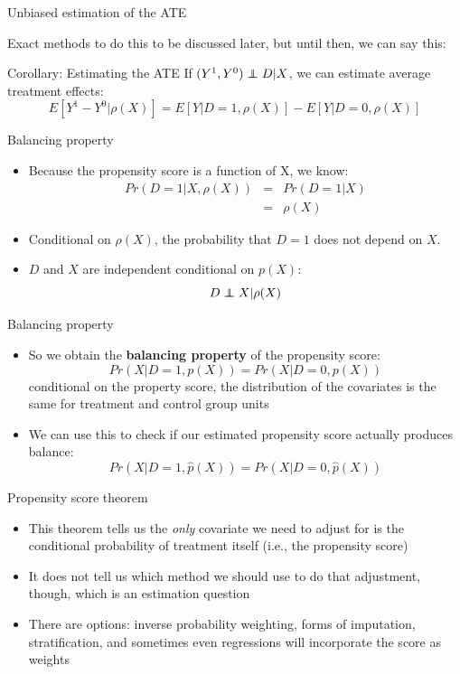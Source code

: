 \documentclass{beamer}
\newcommand\independent{\protect\mathpalette{\protect\independenT}{\perp}}
\def\independenT#1#2{\mathrel{\rlap{$#1#2$}\mkern2mu{#1#2}}}
\begin{document}
\begin{frame}{Unbiased estimation of the ATE}

Exact methods to do this to be discussed later, but until then, we can say this:
	\begin{block}{Corollary: Estimating the ATE}
	If $(Y^1,Y^0)\independent{D}|X$, we can estimate average treatment effects:
 $$E[Y^1-Y^0|\rho(X)] = E[Y|D=1,\rho(X)] - E[Y|D=0,\rho(X)]$$
	\end{block}
	
\end{frame}

\begin{frame}{Balancing property}
	
	\begin{itemize}
	\item Because the propensity score is a function of X, we know:
		\begin{eqnarray*}
		Pr(D=1 | X,\rho(X)) &=& Pr(D=1|X)\\
		&=& \rho(X)
		\end{eqnarray*}
	\item Conditional on $\rho(X)$, the probability that $D=1$ does not depend on $X$.  
	\item $D$ and $X$ are independent conditional on $p(X)$: $$D\independent{X} | \rho(X)$$
	\end{itemize}
\end{frame}


\begin{frame}{Balancing property}

\begin{itemize}
	\item So we obtain the \textbf{balancing property} of the propensity score: $$Pr(X|D=1,p(X)) = Pr(X|D=0, p(X))$$ conditional on the property score, the distribution of the covariates is the same for treatment and control group units
	\item We can use this to check if our estimated propensity score actually produces balance:$$Pr(X|D=1,\widehat{p}(X)) = Pr(X|D=0, \widehat{p}(X))$$
\end{itemize}

\end{frame}


\begin{frame}{Propensity score theorem}
	
	\begin{itemize}
	\item This theorem tells us the \emph{only} covariate we need to adjust for is the conditional probability of treatment itself (i.e., the propensity score)
	\item It does not tell us which method we should use to do that adjustment, though, which is an estimation question
	\item There are options: inverse probability weighting, forms of imputation, stratification, and sometimes even regressions will incorporate the score as weights
	\end{itemize}
\end{frame}
\end{document}
